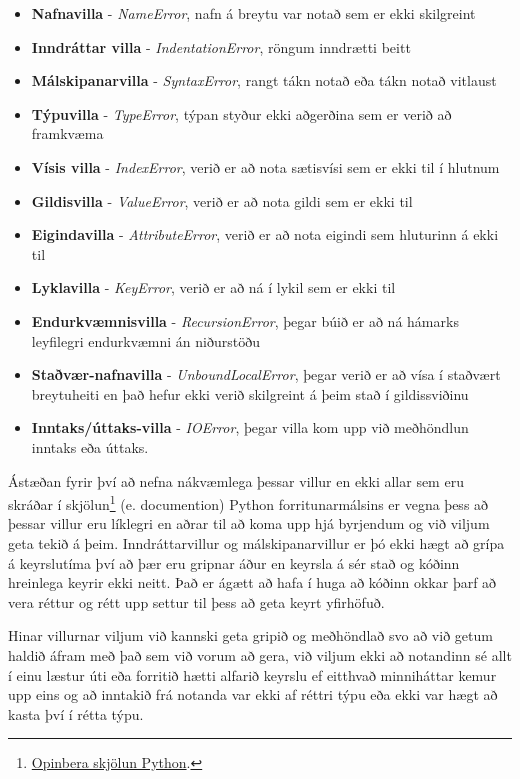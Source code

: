 \begin{itemize}
	\item \textbf{Nafnavilla} - \emph{NameError}, nafn á breytu var notað sem er ekki skilgreint
	\item \textbf{Inndráttar villa }- \emph{IndentationError}, röngum inndrætti beitt
	\item \textbf{Málskipanarvilla} - \emph{SyntaxError}, rangt tákn notað eða tákn notað vitlaust
	\item \textbf{Týpuvilla} - \emph{TypeError}, týpan styður ekki aðgerðina sem er verið að framkvæma
	\item \textbf{Vísis villa} - \emph{IndexError}, verið er að nota sætisvísi sem er ekki til í hlutnum
	\item \textbf{Gildisvilla} - \emph{ValueError}, verið er að nota gildi sem er ekki til
	\item \textbf{Eigindavilla} - \emph{AttributeError}, verið er að nota eigindi sem hluturinn á ekki til
	\item \textbf{Lyklavilla} - \emph{KeyError}, verið er að ná í lykil sem er ekki til
	\item \textbf{Endurkvæmnisvilla} - \emph{RecursionError}, þegar búið er að ná hámarks leyfilegri endurkvæmni án niðurstöðu
	\item \textbf{Staðvær-nafnavilla} - \emph{UnboundLocalError}, þegar verið er að vísa í staðvært breytuheiti en það hefur ekki verið skilgreint á þeim stað í gildissviðinu
	\item \textbf{Inntaks/úttaks-villa} - \emph{IOError}, þegar villa kom upp við meðhöndlun inntaks eða úttaks.
\end{itemize}
\vspace{0.5cm}
Ástæðan fyrir því að nefna nákvæmlega þessar villur en ekki allar sem eru skráðar í skjölun\footnote{\href{https://docs.python.org/}{Opinbera skjölun Python}.} (e. documention) Python forritunarmálsins er vegna þess að þessar villur eru líklegri en aðrar til að koma upp hjá byrjendum og við viljum geta tekið á þeim.
Inndráttarvillur og málskipanarvillur er þó ekki hægt að grípa á keyrslutíma því að þær eru gripnar áður en keyrsla á sér stað og kóðinn hreinlega keyrir ekki neitt.
Það er ágætt að hafa í huga að kóðinn okkar þarf að vera réttur og rétt upp settur til þess að geta keyrt yfirhöfuð.

Hinar villurnar viljum við kannski geta gripið og meðhöndlað svo að við getum haldið áfram með það sem við vorum að gera, við viljum ekki að notandinn sé allt í einu læstur úti eða forritið hætti alfarið keyrslu ef eitthvað minniháttar kemur upp eins og að inntakið frá notanda var ekki af réttri týpu eða ekki var hægt að kasta því í rétta týpu.

